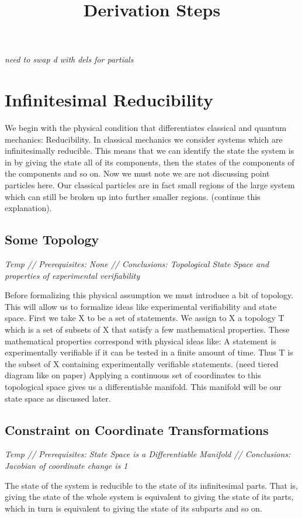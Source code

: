 \documentclass{article}
\begin{document}
\title{Derivation Steps}
\textsl{need to swap d with dels for partials}

\section{Infinitesimal Reducibility}

	We begin with the physical condition that differentiates classical and quantum mechanics: Reducibility. In classical mechanics we consider systems which are infinitesimally reducible. This means that we can identify the state the system is in by giving the state all of its components, then the states of the components of the components and so on. Now we must note we are not discussing point particles here. Our classical particles are in fact small regions of the large system which can still be broken up into further smaller regions. (continue this explanation). 
	
\subsection{Some Topology}
\textsl{Temp // Prerequisites: None // Conclusions: Topological State Space and properties of experimental verifiability}

	Before formalizing this physical assumption we must introduce a bit of topology. This will allow us to formalize ideas like experimental verifiability and state space. First we take X to be a set of statements. We assign to X a topology T which is a set of subsets of X that satisfy a few mathematical properties. These mathematical properties correspond with physical ideas like: A statement is experimentally verifiable if it can be tested in a finite amount of time. Thus T is the subset of X containing experimentally verifiable statements. (need tiered diagram like on paper) Applying a continuous set of coordinates to this topological space gives us a differentiable manifold. This manifold will be our state space as discussed later.
	
\subsection{Constraint on Coordinate Transformations}
\textsl{Temp // Prerequisites: State Space is a Differentiable Manifold // Conclusions: Jacobian of coordinate change is 1}

\begin{assump}
	The state of the system is reducible to the state of its infinitesimal
	parts. That is, giving the state of the whole system is equivalent to giving the state of its parts, which in turn is equivalent to giving the state of its subparts and so on.
\end{assump}
\end{document}
